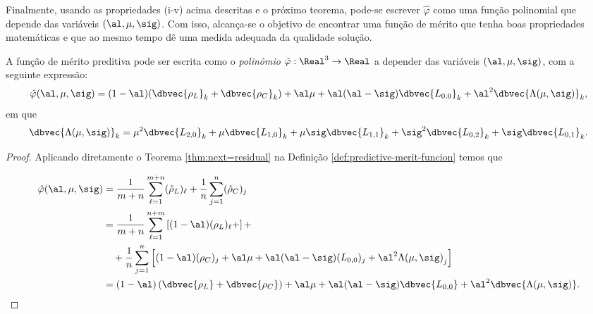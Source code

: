 Finalmente, usando as propriedades (i-v) acima descritas e o próximo teorema,
pode-se escrever $\hat{\varphi}$ como uma função polinomial que depende das
variáveis $(\al,\mu,\sig)$. Com isso, alcança-se o objetivo de encontrar uma
função de mérito que tenha boas propriedades matemáticas e que ao mesmo tempo dê
uma medida adequada da qualidade solução.
\begin{teo}
\label{thm:varphi}  
A função de mérito preditiva pode ser escrita como o \emph{polinômio} 
$\hat{\varphi}:\Real^3\to\Real$ a depender das variáveis $(\al,\mu,\sig)$, com a seguinte
expressão:
\begin{equation}
\label{eq:merit-function-al-mu-sig}
\hat{\varphi}(\al,\mu,\sig) = (1-\al)(\dbvec{\rho_L}_k +
\dbvec{\rho_C}_k) + \al\mu + \al(\al-\sig)\dbvec{L_{0,0}}_k +
\al^2\dbvec{\Lambda(\mu,\sig)}_k,
\end{equation}
em que 
\[
\dbvec{\Lambda(\mu,\sig)}_k = \mu^2
 \dbvec{L_{2,0}}_k + \mu \dbvec{L_{1,0}}_k + 	\mu \sig \dbvec{L_{1,1}}_k +
 \sig^2 \dbvec{L_{0,2}}_k + \sig \dbvec{L_{0,1}}_k.
 \]
 
  \end{teo}
\begin{proof} Aplicando diretamente o Teorema \ref{thm:next=residual} na
Definição \ref{def:predictive-merit-funcion} temos que

 \[
\begin{aligned}
\hat{\varphi}(\al,\mu,\sig) & =
\frac{1}{m+n}\sum_{\ell=1}^{m+n}(\hat{\rho}_L)_\ell +
\frac{1}{n}\sum_{j=1}^{n}(\hat{\rho}_C)_j \\
						 & = \frac{1}{m+n}\sum_{\ell=1}^{n+m}\left[(1-\al)(\rho_L)_\ell +
						 \right] +
						 \\
				 	 & \quad  + \frac{1}{n}\sum_{j=1}^{n}  \left[ (1-\al)(\rho_C)_j +
				 	 \al\mu + \al(\al-\sig)(L_{0,0})_j + \al^2{\Lambda(\mu,\sig)}_j \right] \\
				 	 & = (1-\al)\left(\dbvec{\rho_L} + \dbvec{\rho_C}\right) + \al\mu +
\al(\al-\sig)\dbvec{L_{0,0}} + \al^2\dbvec{\Lambda(\mu,\sig)}.	
\end{aligned}
\]
\end{proof}



